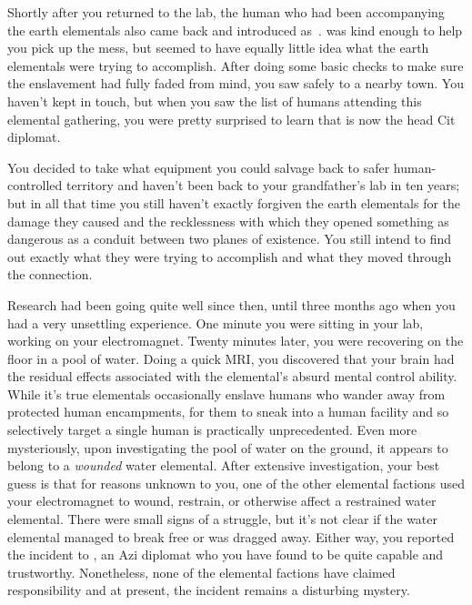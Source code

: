 \documentclass[char]{elementals}
\begin{document}
Shortly after you returned to the lab, the human who had been accompanying the earth elementals also came back and introduced \cAvatar{\themself} as~\cAvatar{\intro}. \cAvatar{\They} was kind enough to help you pick up the mess, but seemed to have equally little idea what the earth elementals were trying to accomplish. After doing some basic checks to make sure the enslavement had fully faded from \cAvatar{\their} mind, you saw \cAvatar{\them} safely to a nearby town. You haven't kept in touch, but when you saw the list of humans attending this elemental gathering, you were pretty surprised to learn that \cAvatar{} is now the head Cit diplomat.

You decided to take what equipment you could salvage back to safer human-controlled territory and haven't been back to your grandfather's lab in ten years; but in all that time you still haven't exactly forgiven the earth elementals for the damage they caused and the recklessness with which they opened something as dangerous as a conduit between two planes of existence. You still intend to find out exactly what they were trying to accomplish and what they moved through the connection.

Research had been going quite well since then, until three months ago when you had a very unsettling experience. One minute you were sitting in your lab, working on your electromagnet. Twenty minutes later, you were recovering on the floor in a pool of water. Doing a quick MRI, you discovered that your brain had the residual effects associated with the elemental's absurd mental control ability. While it's true elementals occasionally enslave humans who wander away from protected human encampments, for them to sneak into a human facility and so selectively target a single human is practically unprecedented. Even more mysteriously, upon investigating the pool of water on the ground, it appears to belong to a \emph{wounded} water elemental. After extensive investigation, your best guess is that for reasons unknown to you, one of the other elemental factions used your electromagnet to wound, restrain, or otherwise affect a restrained water elemental. There were small signs of a struggle, but it's not clear if the water elemental managed to break free or was dragged away. Either way, you reported the incident to \cDiplomat{\intro}, an Azi diplomat who you have found to be quite capable and trustworthy. Nonetheless, none of the elemental factions have claimed responsibility and at present, the incident remains a disturbing mystery.
\end{document}
